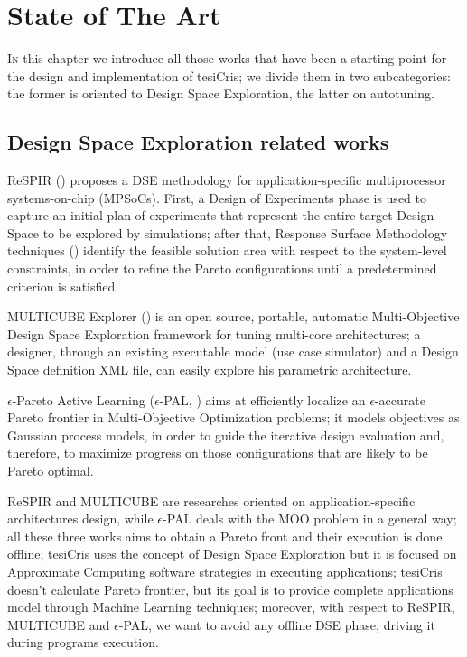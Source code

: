 \chapter{State of The Art}

\lettrine{I}{n} this chapter we introduce all those works that have been a starting point for the design and implementation of tesiCris; we divide them in two subcategories: the former is oriented to Design Space Exploration, the latter on autotuning.

\section{Design Space Exploration related works}

ReSPIR (\cite{palermo2009respir}) proposes a DSE methodology for application-specific multiprocessor systems-on-chip (MPSoCs). First, a Design of Experiments phase is used to capture an initial plan of experiments that represent the entire target Design Space to be explored by simulations; after that, Response Surface Methodology techniques (\cite{khuri2010response}) identify the feasible solution area with respect to the system-level constraints, in order to refine the Pareto configurations until a predetermined criterion is satisfied.

MULTICUBE Explorer (\cite{silvano2011multicube}) is an open source, portable, automatic Multi-Objective Design Space Exploration framework for tuning multi-core architectures; a designer, through an existing executable model (use case simulator) and a Design Space definition XML file, can easily explore his parametric architecture.

$\epsilon$-Pareto Active Learning ($\epsilon$-PAL, \cite{zuluaga2016e}) aims at efficiently localize an $\epsilon$-accurate Pareto frontier in Multi-Objective Optimization problems; it models objectives as Gaussian process models, in order to guide the iterative design evaluation and, therefore, to maximize progress on those configurations that are likely to be Pareto optimal.

ReSPIR and MULTICUBE are researches oriented on application-specific architectures design, while $\epsilon$-PAL deals with the MOO problem in a general way; all these three works aims to obtain a Pareto front and their execution is done offline; tesiCris uses the concept of Design Space Exploration but it is focused on Approximate Computing software strategies in executing applications; tesiCris doesn't calculate Pareto frontier, but its goal is to provide complete applications model through Machine Learning techniques; moreover, with respect to ReSPIR, MULTICUBE and $\epsilon$-PAL, we want to avoid any offline DSE phase, driving it during programs execution.

